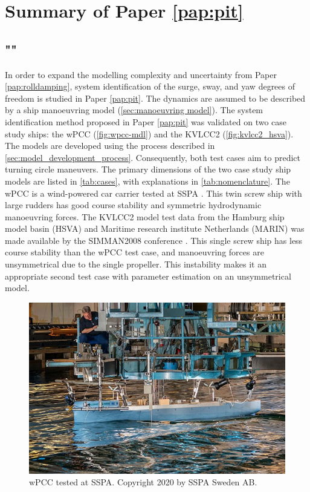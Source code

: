 \section{Summary of Paper \ref{pap:pit}}
\subsection*{""}
In order to expand the modelling complexity and uncertainty from Paper \ref{pap:rolldamping}, system identification of the surge, sway, and yaw degrees of freedom is studied in Paper \ref{pap:pit}. The dynamics are assumed to be described by a ship manoeuvring model (\autoref{sec:manoeuvring model}). The system identification method proposed in Paper \ref{pap:pit} was validated on two case study ships: the wPCC (\autoref{fig:wpcc-mdl}) and the KVLCC2 (\autoref{fig:kvlcc2_hsva}). The models are developed using the process described in \autoref{sec:model_development_process}. Consequently, both test cases aim to predict turning circle maneuvers. The primary dimensions of the two case study ship models are listed in \autoref{tab:cases}, with explanations in \autoref{tab:nomenclature}. The wPCC is a wind-powered car carrier tested at SSPA \cite{alexandersson_wpcc_2022}. This twin screw ship with large rudders has good course stability and symmetric hydrodynamic manoeuvring forces. The KVLCC2 model test data from the Hamburg ship model basin (HSVA) and Maritime research institute Netherlands (MARIN) was made available by the SIMMAN2008 conference \cite{stern_experience_2011}. This single screw ship has less course stability than the wPCC test case, and manoeuvring forces are unsymmetrical due to the single propeller. This instability makes it an appropriate second test case with parameter estimation on an unsymmetrical model.

\begin{figure}[h!]
\centering
\includegraphics[width=0.7\linewidth]{kappa/images/wpcc_mdl.png}
\caption{wPCC tested at SSPA. Copyright 2020 by SSPA Sweden AB.}
\label{fig:wpcc-mdl}
\end{figure}

